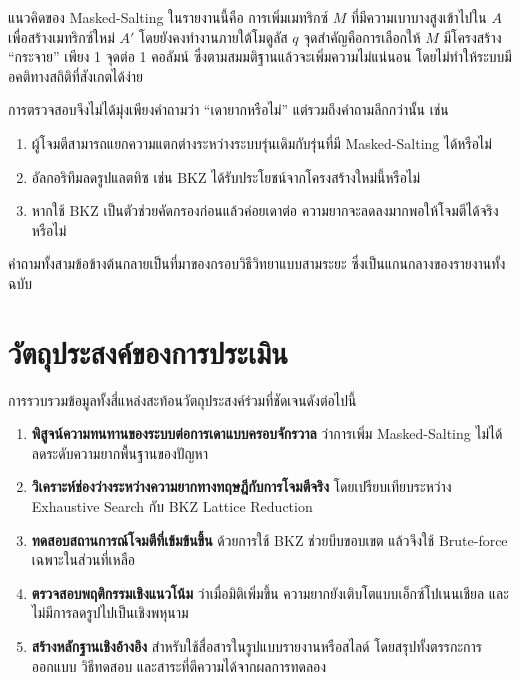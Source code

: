 \documentclass[12pt,a4paper]{article}
\newcommand{\term}[1]{\textbf{#1}}
\newcommand{\eng}[1]{\textenglish{#1}}
\begin{document}
	แนวคิดของ \eng{Masked-Salting} ในรายงานนี้คือ การเพิ่มเมทริกซ์ $M$ ที่มีความเบาบางสูงเข้าไปใน $A$ เพื่อสร้างเมทริกซ์ใหม่ $A'$ โดยยังคงทำงานภายใต้โมดูลัส $q$ จุดสำคัญคือการเลือกให้ $M$ มีโครงสร้าง ``กระจาย'' เพียง 1 จุดต่อ 1 คอลัมน์ ซึ่งตามสมมติฐานแล้วจะเพิ่มความไม่แน่นอน โดยไม่ทำให้ระบบมีอคติทางสถิติที่สังเกตได้ง่าย
	
	การตรวจสอบจึงไม่ได้มุ่งเพียงคำถามว่า ``เดายากหรือไม่'' แต่รวมถึงคำถามลึกกว่านั้น เช่น
	\begin{enumerate}[label=\alph*)]
		\item ผู้โจมตีสามารถแยกความแตกต่างระหว่างระบบรุ่นเดิมกับรุ่นที่มี \eng{Masked-Salting} ได้หรือไม่
		\item อัลกอริทึมลดรูปแลตทิซ เช่น \eng{BKZ} ได้รับประโยชน์จากโครงสร้างใหม่นี้หรือไม่
		\item หากใช้ \eng{BKZ} เป็นตัวช่วยคัดกรองก่อนแล้วค่อยเดาต่อ ความยากจะลดลงมากพอให้โจมตีได้จริงหรือไม่
	\end{enumerate}
	
	คำถามทั้งสามข้อข้างต้นกลายเป็นที่มาของกรอบวิธีวิทยาแบบสามระยะ ซึ่งเป็นแกนกลางของรายงานทั้งฉบับ
	
	\section{วัตถุประสงค์ของการประเมิน}
	
	การรวบรวมข้อมูลทั้งสี่แหล่งสะท้อนวัตถุประสงค์ร่วมที่ชัดเจนดังต่อไปนี้
	\begin{enumerate}[label=\arabic*.]
		\item \term{พิสูจน์ความทนทานของระบบต่อการเดาแบบครอบจักรวาล} ว่าการเพิ่ม \eng{Masked-Salting} ไม่ได้ลดระดับความยากพื้นฐานของปัญหา
		\item \term{วิเคราะห์ช่องว่างระหว่างความยากทางทฤษฎีกับการโจมตีจริง} โดยเปรียบเทียบระหว่าง \eng{Exhaustive Search} กับ \eng{BKZ Lattice Reduction}
		\item \term{ทดสอบสถานการณ์โจมตีที่เข้มข้นขึ้น} ด้วยการใช้ \eng{BKZ} ช่วยบีบขอบเขต แล้วจึงใช้ \eng{Brute-force} เฉพาะในส่วนที่เหลือ
		\item \term{ตรวจสอบพฤติกรรมเชิงแนวโน้ม} ว่าเมื่อมิติเพิ่มขึ้น ความยากยังเติบโตแบบเอ็กซ์โปเนนเชียล และไม่มีการลดรูปไปเป็นเชิงพหุนาม
		\item \term{สร้างหลักฐานเชิงอ้างอิง} สำหรับใช้สื่อสารในรูปแบบรายงานหรือสไลด์ โดยสรุปทั้งตรรกะการออกแบบ วิธีทดสอบ และสาระที่ตีความได้จากผลการทดลอง
	\end{enumerate}
	
\end{document}
